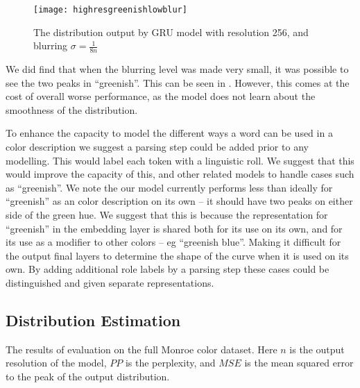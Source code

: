 \documentclass[11pt,letterpaper]{article}
\begin{document}
\begin{figure}
	
	\texttt{[image: highresgreenishlowblur]}
	\caption{\label{fighighresgreenishlowblur} The distribution output by GRU model with resolution 256, and blurring $\sigma=\frac{1}{8n}$}
\end{figure}
We did find that when the blurring level was made very small, it was possible to see the two peaks in ``greenish''.
This can be seen in .
However, this comes at the cost of overall worse performance, as the model does not learn about the smoothness of the distribution.





To enhance the capacity to model the different ways a word can be used in a color description we suggest a parsing step could be added prior to any modelling.
This would label each token with a linguistic roll.
We suggest that this would improve the capacity of this, and other related models to handle cases such as ``greenish''.
We note the our model currently performs less than ideally for ``greenish'' as an color description on its own -- it should have two peaks on either side of the green hue.
We suggest that this is because the representation for ``greenish'' in the embedding layer is shared both for its use on its own, and for its use as a modifier to other colors -- eg ``greenish blue''.
Making it difficult for the output final layers to determine the shape of the curve when it is used on its own.
By adding additional role labels by a parsing step these cases could be distinguished and given separate representations.

\subsection{Distribution Estimation}

\begin{table*}
	\centering
	\caption{\label{tblresfull} The results of evaluation on the full Monroe color dataset. Here $n$ is the output resolution of the model, $PP$ is the perplexity, and $MSE$ is the mean squared error to the peak of the output distribution.}
\end{table*}
\end{document}

